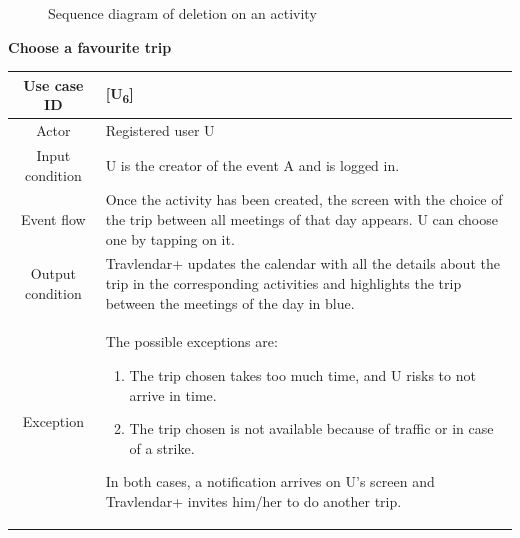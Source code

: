 \documentclass[12pt,titlepage]{article}
\begin{document}
\begin{figure}
\centering
{} 
\caption{Sequence diagram of deletion on an activity}
\end{figure}
\clearpage
\newpage


\begin{flushleft}
\textbf{Choose a favourite trip}
\end{flushleft}

\begin{tabular}{cp{10cm}} 
Use case ID& {[U\textsubscript{6}]}\\ \hline
Actor&Registered user U \\ \hline 

Input condition&U is the creator of the event A and is logged in.\\ \hline
Event flow&Once the activity has been created, the screen with the choice of the trip between all meetings of that day appears. U can choose one by tapping on it. \\ \hline
Output condition& Travlendar+ updates the calendar with all the details about the trip in the corresponding activities and highlights the trip between the meetings of the day in blue. 
\\ \hline
Exception& The possible exceptions are:
\begin{enumerate}
\item The trip chosen takes too much time, and U risks to not arrive in time. 
\item The trip chosen is not available because of traffic or in case of a strike. 
\end{enumerate} 
In both cases, a notification arrives on U's screen and Travlendar+ invites him/her to do another trip. \\ \hline 

\end{tabular}
\end{document}
